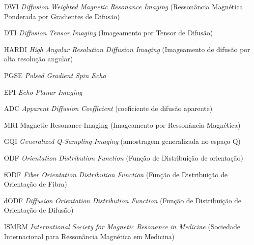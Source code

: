 \documentclass[
    12pt,                %
    oneside,            %
    a4paper,            %
    english,            %
    french,                %
    spanish,            %
    brazil                %
    ]{abntex2}
\begin{document}
\begin{siglas}
\item[DWI] \textit{Diffusion Weighted Magnetic Resonance Imaging} (Ressonância Magnética Ponderada por Gradientes de Difusão)
  
\item[DTI] \textit{Diffusion Tensor Imaging} (Imageamento por Tensor de Difusão)

\item[HARDI] \textit{High Angular Resolution Diffusion Imaging} (Imageamento de difusão por alta resolução angular)

\item[PGSE] \textit{Pulsed Gradient Spin Echo}

\item[EPI] \textit{Echo-Planar Imaging}

\item[ADC] \textit{Apparent Diffusion Coefficient} (coeficiente de difusão aparente)



\item[MRI] Magnetic Resonance Imaging (Imageamento por Ressonância Magnética)


\item[GQI] \textit{Generalized Q-Sampling Imaging} (amostragem generalizada no espaço Q)


\item[ODF] \textit{Orientation Distribution Function} (Função de Distribuição de orientação)

\item[fODF] \textit{Fiber Orientation Distribution Function} (Função de Distribuição de Orientação de Fibra)

\item[dODF] \textit{Diffusion Orientation Distribution Function} (Função de Distribuição de Orientação de Difusão)

\item[ISMRM]    \textit{International Society for Magnetic Resonance in Medicine} (Sociedade Internacional para Ressonância Magnética em Medicina)


\end{siglas}
\end{document}
